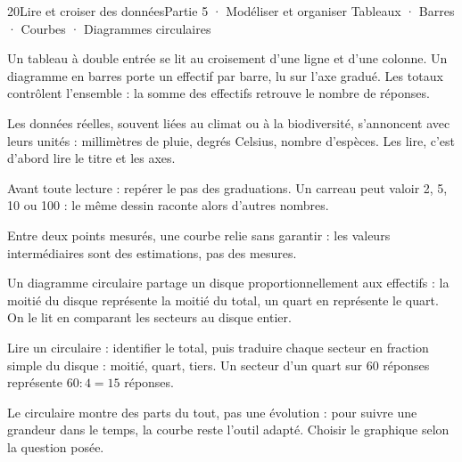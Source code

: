 \begin{ouverture}[statistiques]{20}{Lire et croiser des données}{Partie 5 · Modéliser et organiser}
{Tableaux · Barres · Courbes · Diagrammes circulaires}
\end{ouverture}
\pagestyle{otMain}\essentiel\fontsize{11}{15}\selectfont
{}\label{cours-20-1}
\begin{definition}Un tableau à double entrée se lit au croisement d’une ligne et d’une colonne. Un diagramme en barres porte un effectif par barre, lu sur l’axe gradué. Les totaux contrôlent l’ensemble : la somme des effectifs retrouve le nombre de réponses.\end{definition}
\begin{exemple}Les données réelles, souvent liées au climat ou à la biodiversité, s’annoncent avec leurs unités : millimètres de pluie, degrés Celsius, nombre d’espèces. Les lire, c’est d’abord lire le titre et les axes.\end{exemple}
\begin{savoirfaire}Avant toute lecture : repérer le pas des graduations. Un carreau peut valoir 2, 5, 10 ou 100 : le même dessin raconte alors d’autres nombres.\end{savoirfaire}
\begin{attention}Entre deux points mesurés, une courbe relie sans garantir : les valeurs intermédiaires sont des estimations, pas des mesures.\end{attention}
\clearpage
{}\label{cours-20-2}
\begin{definition}Un diagramme circulaire partage un disque proportionnellement aux effectifs : la moitié du disque représente la moitié du total, un quart en représente le quart. On le lit en comparant les secteurs au disque entier.\end{definition}
\label{fig-cours-20-2-cours-circulaire}

\begin{savoirfaire}Lire un circulaire : identifier le total, puis traduire chaque secteur en fraction simple du disque : moitié, quart, tiers. Un secteur d’un quart sur 60 réponses représente $60:4=15$ réponses.\end{savoirfaire}
\begin{attention}Le circulaire montre des parts du tout, pas une évolution : pour suivre une grandeur dans le temps, la courbe reste l’outil adapté. Choisir le graphique selon la question posée.\end{attention}


